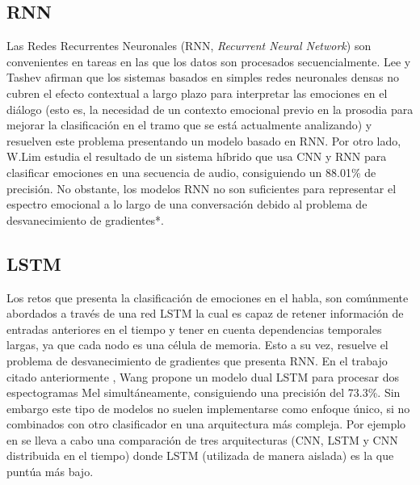 \documentclass[11pt,a4paper,spanish]{book}
\begin{document}
	\subsection{RNN}
	Las Redes Recurrentes Neuronales (RNN, \emph{Recurrent Neural Network}) son convenientes en tareas en las que los datos son procesados secuencialmente.
	Lee y Tashev \cite{Lee2015} afirman que los sistemas basados en simples redes neuronales densas no cubren el efecto contextual a largo plazo para interpretar las emociones en el diálogo (esto es, la necesidad de un contexto emocional previo en la prosodia para mejorar la clasificación en el tramo que se está actualmente analizando) y resuelven este problema presentando un modelo basado en RNN. Por otro lado, W.Lim \cite{Lim2017} estudia el resultado de un sistema híbrido que usa CNN y RNN para clasificar emociones en una secuencia de audio, consiguiendo un 88.01\% de precisión.
	No obstante, los modelos RNN no son suficientes para representar el espectro emocional a lo largo de una conversación debido al problema de desvanecimiento de gradientes*.
	
	\subsection{LSTM}
	Los retos que presenta la clasificación de emociones en el habla, son comúnmente abordados a través de una red LSTM la cual es capaz de retener información de entradas anteriores en el tiempo y tener en cuenta dependencias temporales largas, ya que cada nodo es una célula de memoria. Esto a su vez, resuelve el problema de desvanecimiento de gradientes que presenta RNN.
	En el trabajo citado anteriormente \cite{Wang2020}, Wang propone un modelo dual LSTM para procesar dos espectogramas Mel simultáneamente, consiguiendo una precisión del 73.3\%. 
	Sin embargo este tipo de modelos no suelen implementarse como enfoque único, si no combinados con otro clasificador en una arquitectura más compleja. Por ejemplo en \cite{Lim2017} se lleva a cabo una comparación de tres  arquitecturas (CNN, LSTM y CNN distribuida en el tiempo) donde LSTM (utilizada de manera aislada) es la que puntúa más bajo.
	
\end{document}
